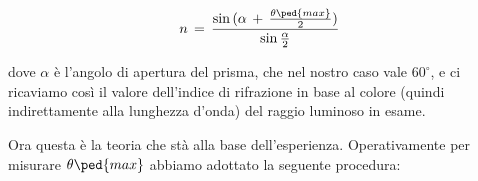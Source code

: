 \begin{equation}
	n \,=\, \frac{\sin{(\alpha\,+\,\frac{\theta\ped{max}}{2})}}{\sin{\frac{\alpha}{2}}}
\end{equation}

dove $\alpha$ è l'angolo di apertura del prisma, che nel nostro caso vale $60^\circ$, e ci ricaviamo così il valore dell'indice di rifrazione in base al colore (quindi indirettamente alla lunghezza d'onda) del raggio luminoso in esame.

Ora questa è la teoria che stà alla base dell'esperienza. Operativamente per misurare $\theta\ped{max}$ abbiamo adottato la seguente procedura:
